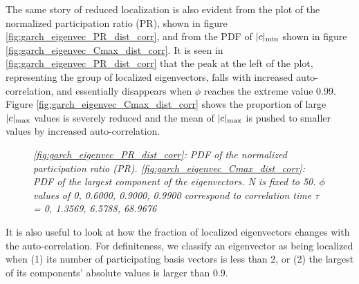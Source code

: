 \documentclass{report}
\begin{document}
The same story of reduced localization is also evident from the plot
of the normalized participation ratio (PR), shown in figure
\ref{fig:garch_eigenvec_PR_dist_corr}, and from the PDF of $|c|_{\text{min}}$
shown in figure \ref{fig:garch_eigenvec_Cmax_dist_corr}. It is seen
in \ref{fig:garch_eigenvec_PR_dist_corr} that the peak at the left 
of the plot, representing the group of localized eigenvectors, falls
with increased auto-correlation, and essentially disappears when
$\phi$ reaches the extreme value 0.99. Figure
\ref{fig:garch_eigenvec_Cmax_dist_corr} shows the proportion of large
$|c|_{\text{max}}$ values is severely reduced and the mean of $|c|_{\text{max}}$ is pushed
to smaller values by increased auto-correlation.
\begin{figure}[htb!]
  \centering
  \caption{\small \it \ref{fig:garch_eigenvec_PR_dist_corr}: PDF of
    the normalized participation ratio
    (PR). \ref{fig:garch_eigenvec_Cmax_dist_corr}: PDF of the largest
    component of the eigenvectors. N is fixed to 50. $\phi$ values of
    0, 0.6000, 0.9000, 0.9900 correspond to correlation time $\tau$ =
    0, 1.3569, 6.5788, 68.9676}
\end{figure}

It is also useful to look at how the fraction of localized eigenvectors
changes with the auto-correlation. For definiteness, we classify
an eigenvector as being localized when (1) its number of participating
basis vectors is less than 2, or (2) the largest of its components'
absolute values is larger than 0.9.
\end{document}
